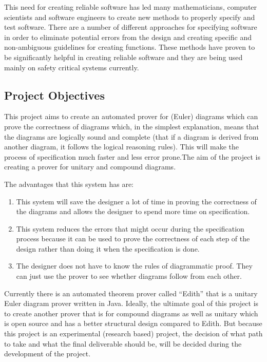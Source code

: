 \documentclass[10pt, a4paper, titlepage]{article}
\begin{document}
This need for creating reliable software has led many mathematicians, computer scientists and software engineers to create new methods to properly specify and test software. There are a number of different approaches for specifying software in order to eliminate potential errors from the design and creating specific and non-ambiguous guidelines for creating functions. These methods have proven to be significantly helpful in creating reliable software and they are being used mainly on safety critical systems currently.


\subsection{Project Objectives}

This project aims to create an automated  prover for (Euler) diagrams which can prove the correctness of diagrams which, in the simplest explanation, means that the diagrams are logically sound and complete (that if a diagram is derived from another diagram, it follows the logical reasoning rules). This will make the process of specification much faster and less error prone.The aim of the project is creating a prover for unitary and compound diagrams. 

The advantages that this system has are:
\begin{enumerate}
\item This system will save the designer a lot of time in proving the correctness of the diagrams and allows the designer to spend more time on specification.
\item This system reduces the errors that might occur during the specification process because it can be used to prove the correctness of each step of the design rather than doing it when the specification is done.
\item The designer does not have to know the rules of diagrammatic proof. They can just use the prover to see whether diagrams follow from each other.
\end{enumerate}

Currently there is an automated theorem prover called “Edith” that is a unitary Euler diagram prover written in Java. Ideally, the ultimate goal of this project is to create another prover that is for compound diagrams as well as unitary which is open source and has a better structural design compared to Edith. But because this project is an experimental (research based) project, the decision of what path to take and what the final deliverable should be, will be decided during the development of the project. 
\end{document}
